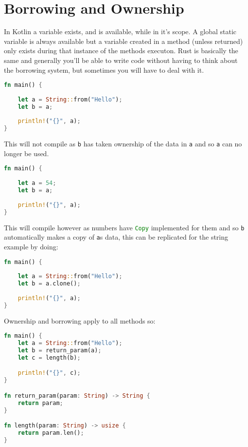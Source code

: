 \documentclass[a4paper,11pt]{article}
\begin{document}
\newpage
\section{Borrowing and Ownership}
In Kotlin a variable exists, and is available, while in it's scope. A global static variable is always available but a variable created in a method (unless returned) only exists during that instance of the methods executon. Rust is basically the same and generally you'll be able to write code without having to think about the borrowing system, but sometimes you will have to deal with it.
\begin{lstlisting}[language=Rust,frame=single]
fn main() {
    
    let a = String::from("Hello");
    let b = a;
    
    println!("{}", a);
}
\end{lstlisting}

This will not compile as \lstinline{b} has taken ownership of the data in \lstinline{a} and so \lstinline{a} can no longer be used.

\begin{lstlisting}[language=Rust,frame=single,caption={Listing B}]
fn main() {
    
    let a = 54;
    let b = a;
    
    println!("{}", a);
}
\end{lstlisting}

This will compile however as numbers have \lstinline[language=Rust]{Copy} implemented for them and so \lstinline{b} automatically makes a copy of \lstinline{a}s data, this can be replicated for the string example by doing:

\begin{lstlisting}[language=Rust,frame=single]
fn main() {
    
    let a = String::from("Hello");
    let b = a.clone();
    
    println!("{}", a);
}
\end{lstlisting}
\newpage
Ownership and borrowing apply to all methods so:

\begin{lstlisting}[language=Rust,frame=single]
fn main() {
    let a = String::from("Hello");
    let b = return_param(a);
    let c = length(b);

    println!("{}", c);
}

fn return_param(param: String) -> String {
	return param;
}

fn length(param: String) -> usize {
	return param.len();
}
\end{lstlisting}
\end{document}
